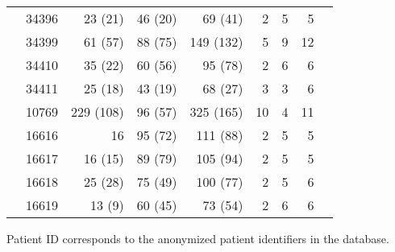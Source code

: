 \documentclass[12pt]{article}
\begin{document}
\begin{table*}
\begin{center}
\begin{tabular}{llrrrrrrr}
& 34396 & 23 (21) & 46 (20) & 69 (41) & 2 & 5 & 5 \\
& 34399 & 61 (57) & 88 (75) & 149 (132) & 5 & 9 & 12 \\
& 34410 & 35 (22) & 60 (56) & 95 (78) & 2 & 6 & 6 \\
& 34411 & 25 (18) & 43 (19) & 68 (27) & 3 & 3 & 6 \\
\cite{Fischer04} & 10769 & 229 (108) & 96 (57) & 325 (165) & 10 & 4 & 11 \\ 
\cite{Llewellyn06} & 16616 & 16 & 95 (72) & 111 (88) & 2 & 5 & 5 \\
& 16617 & 16 (15) & 89 (79) & 105 (94) & 2 & 5 & 5 \\
& 16618 & 25 (28) & 75 (49) & 100 (77) & 2 & 5 & 6 \\
& 16619 & 13 (9) & 60 (45) & 73 (54) & 2 & 6 & 6 \\
\hline
\end{tabular}
\end{center}
   Patient ID corresponds to the anonymized patient identifiers in the database.
\end{table*}

\pagebreak{}
\end{document}
